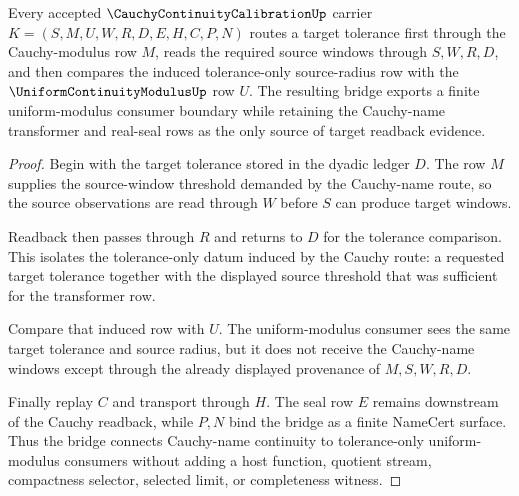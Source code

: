 \begin{theorem}
\label{thm:cauchy-continuity-calibration-cauchy-uniform-bridge}
Every accepted $\CauchyContinuityCalibrationUp$ carrier $K=(S,M,U,W,R,D,E,H,C,P,N)$ routes a target tolerance first through the Cauchy-modulus row $M$, reads the required source windows through $S,W,R,D$, and then compares the induced tolerance-only source-radius row with the $\UniformContinuityModulusUp$ row $U$. The resulting bridge exports a finite uniform-modulus consumer boundary while retaining the Cauchy-name transformer and real-seal rows as the only source of target readback evidence.
\end{theorem}
\begin{proof}
Begin with the target tolerance stored in the dyadic ledger $D$. The row $M$ supplies the source-window threshold demanded by the Cauchy-name route, so the source observations are read through $W$ before $S$ can produce target windows.

Readback then passes through $R$ and returns to $D$ for the tolerance comparison. This isolates the tolerance-only datum induced by the Cauchy route: a requested target tolerance together with the displayed source threshold that was sufficient for the transformer row.

Compare that induced row with $U$. The uniform-modulus consumer sees the same target tolerance and source radius, but it does not receive the Cauchy-name windows except through the already displayed provenance of $M,S,W,R,D$.

Finally replay $C$ and transport through $H$. The seal row $E$ remains downstream of the Cauchy readback, while $P,N$ bind the bridge as a finite NameCert surface. Thus the bridge connects Cauchy-name continuity to tolerance-only uniform-modulus consumers without adding a host function, quotient stream, compactness selector, selected limit, or completeness witness.
\end{proof}


